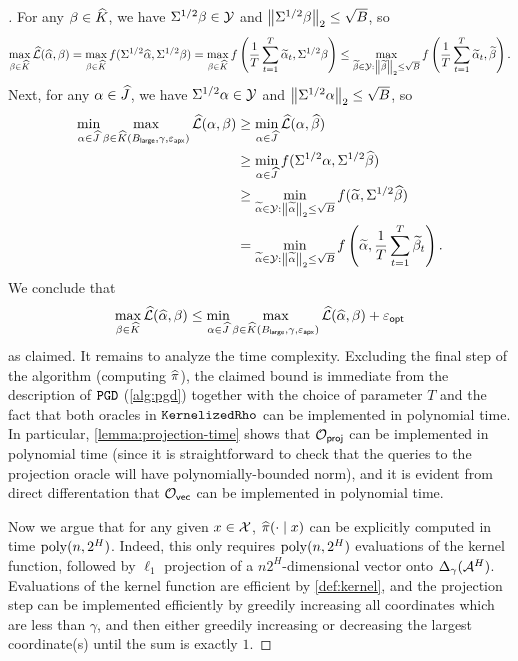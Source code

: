\begin{proof}[]
For any $\beta \in \widehat{K}$, we have $\Sigma^{1/2} \beta \in \mathcal{Y}$ and $\left \lVert \Sigma^{1/2}\beta \right \rVert_2 \leq \sqrt{B}$, so 
\[\max_{\beta \in \widehat{K}} \mathcal{\widehat{L}}(\widehat{\alpha},\beta) = \max_{\beta \in \widehat{K}} f(\Sigma^{1/2} \widehat{\alpha}, \Sigma^{1/2}\beta) = \max_{\beta \in \widehat{K}} f\left(\frac{1}{T}\sum_{t=1}^T \widetilde\alpha_t, \Sigma^{1/2}\beta\right) \leq \max_{\widetilde\beta \in \mathcal{Y}:\left \lVert \widetilde\beta \right \rVert_2\leq \sqrt{B}}  f\left(\frac{1}{T}\sum_{t=1}^T \widetilde\alpha_t, \widetilde\beta\right).\]
Next, for any $\alpha \in \widehat{J}$, we have $\Sigma^{1/2}\alpha \in \mathcal{Y}$ and $\left \lVert \Sigma^{1/2}\alpha \right \rVert_2 \leq \sqrt{B}$, so
\begin{align}
\min_{\alpha \in \widehat{J}} \max_{\beta \in \widehat{K}(B_{\mathsf{large}},\gamma,\varepsilon_{\mathsf{apx}})} \mathcal{\widehat{L}}(\alpha,\beta) 
&\geq \min_{\alpha \in \widehat{J}} \mathcal{\widehat{L}}(\alpha,\widehat{\beta}) \\
&\geq \min_{\alpha \in \widehat{J}} f(\Sigma^{1/2} \alpha, \Sigma^{1/2} \widehat{\beta})\\
&\geq \min_{\widetilde\alpha \in \mathcal{Y}:\left \lVert \widetilde\alpha \right \rVert_2 \leq \sqrt{B}} f(\widetilde\alpha, \Sigma^{1/2}\widehat{\beta})\\ 
&= \min_{\widetilde\alpha \in \mathcal{Y}:\left \lVert \widetilde\alpha \right \rVert_2 \leq \sqrt{B}} f\left(\widetilde\alpha,\frac{1}{T}\sum_{t=1}^T \widetilde\beta_t\right).
\end{align}
We conclude that 
\[\max_{\beta \in \widehat{K}} \mathcal{\widehat{L}}(\widehat{\alpha}, \beta) \leq \min_{\alpha \in \widehat{J}} \max_{\beta \in \widehat{K}(B_{\mathsf{large}},\gamma,\varepsilon_{\mathsf{apx}})} \mathcal{\widehat{L}}(\widehat{\alpha}, \beta) + \varepsilon_{\mathsf{opt}}\]
as claimed. It remains to analyze the time complexity. Excluding the final step of the algorithm (computing $\widehat{\pi}$), the claimed bound is immediate from the description of $\texttt{PGD}$ (\cref{alg:pgd}) together with the choice of parameter $T$ and the fact that both oracles in $\texttt{KernelizedRho}$ can be implemented in polynomial time. In particular, \cref{lemma:projection-time} shows that $\mathcal{O}_{\mathsf{proj}}$ can be implemented in polynomial time (since it is straightforward to check that the queries to the projection oracle will have polynomially-bounded norm), and it is evident from direct differentation that $\mathcal{O}_{\mathsf{vec}}$ can be implemented in polynomial time. 

Now we argue that for any given $x\in\mathcal{X}$, $\widehat{\pi}(\cdot\mid{}x)$ can be explicitly computed in time $\mathrm{poly}(n,2^H)$. Indeed, this only requires $\mathrm{poly}(n,2^H)$ evaluations of the kernel function, followed by $\ell_1$ projection of a $n2^H$-dimensional vector onto $\Delta_\gamma(\mathcal{A}^H)$. Evaluations of the kernel function are efficient by \cref{def:kernel}, and the projection step can be implemented efficiently by greedily increasing all coordinates which are less than $\gamma$, and then either greedily increasing or decreasing the largest coordinate(s) until the sum is exactly $1$.
\end{proof}

